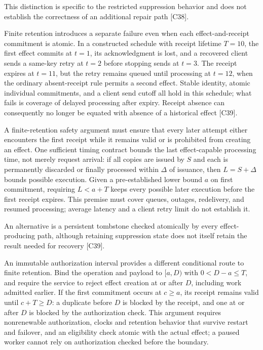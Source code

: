 \documentclass[11pt]{article}
\begin{document}
This distinction is specific to the restricted suppression behavior and does not establish the correctness of an additional repair path [C38].

Finite retention introduces a separate failure even when each effect-and-receipt commitment is atomic. In a constructed schedule with receipt lifetime $T=10$, the first effect commits at $t=1$, its acknowledgment is lost, and a recovered client sends a same-key retry at $t=2$ before stopping sends at $t=3$. The receipt expires at $t=11$, but the retry remains queued until processing at $t=12$, when the ordinary absent-receipt rule permits a second effect. Stable identity, atomic individual commitments, and a client send cutoff all hold in this schedule; what fails is coverage of delayed processing after expiry. Receipt absence can consequently no longer be equated with absence of a historical effect [C39].

A finite-retention safety argument must ensure that every later attempt either encounters the first receipt while it remains valid or is prohibited from creating an effect. One sufficient timing contract bounds the last effect-capable processing time, not merely request arrival: if all copies are issued by $S$ and each is permanently discarded or finally processed within $\Delta$ of issuance, then $L=S+\Delta$ bounds possible execution. Given a pre-established lower bound $a$ on first commitment, requiring $L<a+T$ keeps every possible later execution before the first receipt expires. This premise must cover queues, outages, redelivery, and resumed processing; average latency and a client retry limit do not establish it.

An alternative is a persistent tombstone checked atomically by every effect-producing path, although retaining suppression state does not itself retain the result needed for recovery [C39].

An immutable authorization interval provides a different conditional route to finite retention. Bind the operation and payload to $[a,D)$ with $0<D-a\leq T$, and require the service to reject effect creation at or after $D$, including work admitted earlier. If the first commitment occurs at $c\geq a$, its receipt remains valid until $c+T\geq D$: a duplicate before $D$ is blocked by the receipt, and one at or after $D$ is blocked by the authorization check. This argument requires nonrenewable authorization, clocks and retention behavior that survive restart and failover, and an eligibility check atomic with the actual effect; a paused worker cannot rely on authorization checked before the boundary.
\end{document}
